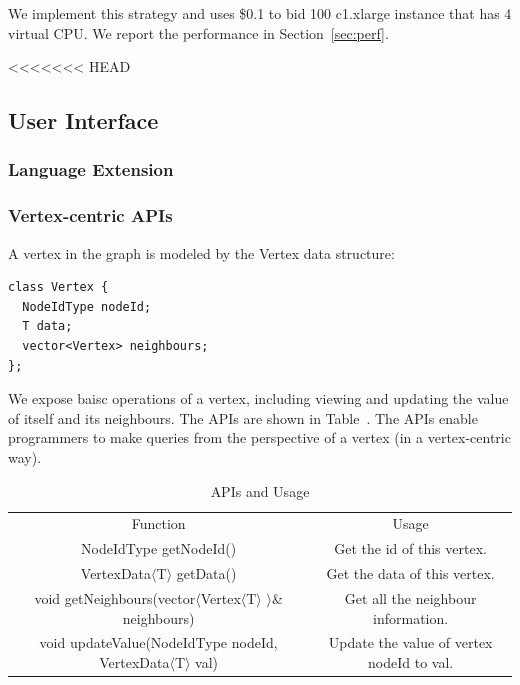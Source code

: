 \documentclass[11pt]{article}
\begin{document}
We implement this strategy and uses \$0.1 to bid 100 c1.xlarge
instance that has 4 virtual CPU. We report the performance in 
Section~\ref{sec:perf}.

<<<<<<< HEAD
\subsection{User Interface}
\subsubsection{Language Extension}

\subsubsection{Vertex-centric APIs}
A vertex in the graph is modeled by the \textsf{Vertex} data structure:
\begin{verbatim}
class Vertex {
  NodeIdType nodeId;
  T data;
  vector<Vertex> neighbours;
};
\end{verbatim}
We expose baisc operations of a vertex, including viewing and updating the 
value of itself and its neighbours. The APIs are shown in 
Table~\cite{table:api}. The APIs enable programmers to make queries 
from the perspective of a vertex (in a vertex-centric way). 
\begin{table}
  \centering
 \begin{tabular}{|c|c|}
 \hline
 \hline
 Function & Usage\\
 NodeIdType getNodeId() & Get the id of this vertex.\\
 VertexData$\langle$T$\rangle$ getData() & Get the data of this vertex.\\
 void getNeighbours(vector$\langle$Vertex$\langle$T$\rangle$ $\rangle$\& 
neighbours) & Get all the neighbour information.\\
 void updateValue(NodeIdType nodeId, VertexData$\langle$T$\rangle$ val) & Update 
the value of vertex nodeId to val.\\
 \hline
 \hline
 \end{tabular}
 \caption{APIs and Usage}
 \label{table:api}
\end{table}
\end{document}
